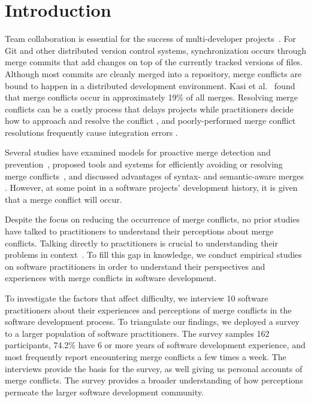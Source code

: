 
\section{Introduction}\label{introduction}


Team collaboration is essential for the success of multi-developer projects~\cite{hattori2010syde}.
For Git and other distributed version control systems, synchronization occurs through merge commits that add changes on top of the currently tracked versions of files.
Although most commits are cleanly merged into a repository, merge conflicts are bound to happen in a distributed development environment.
Kasi et al.~\cite{cassandra} found that merge conflicts occur in approximately 19\% of all merges.
Resolving merge conflicts can be a costly process that delays projects while practitioners decide how to approach and resolve the conflict \cite{cassandra}, and poorly-performed merge conflict resolutions frequently cause integration errors \cite{bird-branches-conflict}.

Several studies have examined models for proactive merge detection and prevention~\cite{Brun2011, palantir, Guimaraes}, proposed tools and systems for efficiently avoiding or resolving merge conflicts~\cite{nishimura}\cite{mens2002state}, and discussed advantages of syntax- and semantic-aware merges \cite{danny_refactorings}\cite{hunt2002extensible}. However, at some point in a software projects' development history, it is given that a merge conflict will occur. 

Despite the focus on reducing the occurrence of merge conflicts, no prior studies have talked to practitioners to understand their perceptions about merge conflicts.
Talking directly to practitioners is crucial to understanding their problems in context~\cite{fritz2010using, sillito2006questions, de2008answering, ko2007information}.
To fill this gap in knowledge, we conduct empirical studies on software practitioners in order to understand their perspectives and experiences with merge conflicts in software development.

To investigate the factors that affect difficulty, we interview 10 software practitioners about their experiences and perceptions of merge conflicts in the software development process.
To triangulate our findings, we deployed a survey to a larger population of software practitioners.
The survey samples 162 participants, 74.2\% have 6 or more years of software development experience, and most frequently report encountering merge conflicts a few times a week.
The interviews provide the basis for the survey, as well giving us personal accounts of merge conflicts.
The survey provides a broader understanding of how perceptions permeate the larger software development community.

